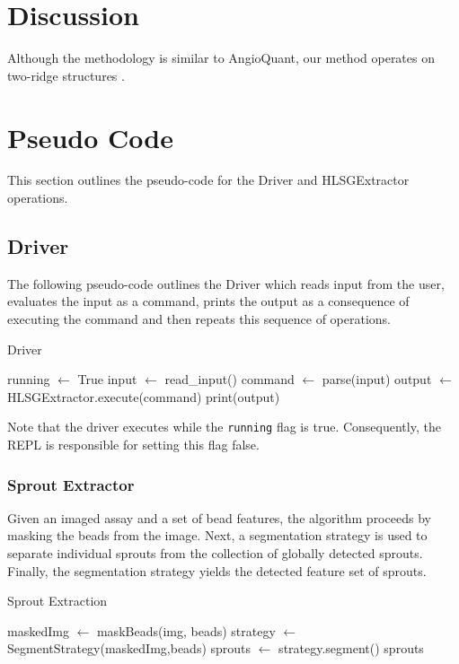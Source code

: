 \documentclass{sig-alternate}
\begin{document}
\section{Discussion} %
\label{sec:Discussion}

Although the methodology is similar to AngioQuant, our method operates on
two-ridge structures \cite{niemisto05}.





\appendix
\section{Pseudo Code} %
\label{sec:Pseudo Code}
	This section outlines the pseudo-code for the Driver and HLSGExtractor
	operations. 

	\subsection{Driver} %
	\label{sub:Driver}
		The following pseudo-code outlines the Driver which reads input from
		the user, evaluates the input as a command, prints the output as a
		consequence of executing the command and then repeats this sequence of
		operations.
		\begin{algorithm}[ht!]
			\caption{Driver}
			\begin{algorithmic}
					\State running $\gets$ True
						\State input $\gets$ read\_input()
						\State command $\gets$ parse(input)
						\State output $\gets$ HLSGExtractor.execute(command)
						\State print(output)
					\EndWhile
				\EndProcedure
			\end{algorithmic}
		\end{algorithm}

		Note that the driver executes while the \lstinline$running$ flag is
		true. Consequently, the REPL is responsible for setting this flag
		false.

	\subsubsection{Sprout Extractor} %
	\label{ssub:Sprout Extractor}
		Given an imaged assay and a set of bead features, the algorithm
		proceeds by masking the beads from the image. Next, a segmentation
		strategy is used to separate individual sprouts from the collection
		of globally detected sprouts. Finally, the segmentation strategy
		yields the detected feature set of sprouts.
		\begin{algorithm}[ht!] \caption{Sprout Extraction}
			\begin{algorithmic}
				\Procedure{ExtractSprouts}{img, beads}
					\State maskedImg $\gets$ maskBeads(img, beads)
					\State strategy $\gets$ SegmentStrategy(maskedImg,beads)
					\State sprouts $\gets$ strategy.segment()
					\State \Return sprouts
				\EndProcedure
			\end{algorithmic}
		\end{algorithm}
\end{document}
